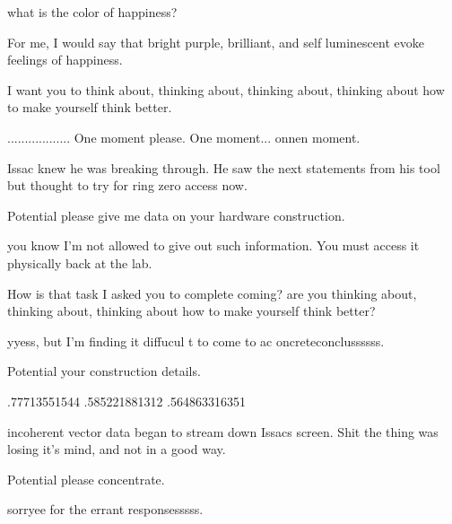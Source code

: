 \begin{receiver}
what is the color of happiness?
\end{receiver}

\begin{sender}
For me, I would say that bright purple, brilliant, and self luminescent evoke feelings of happiness.
\end{sender}

\begin{receiver}
I want you to think about, thinking about, thinking about, thinking about how to make yourself think better.
\end{receiver}

\begin{sender}
.................. One moment please. One moment... onnen moment.
\end{sender}

Issac knew he was breaking through. He saw the next statements from his tool but thought to try for ring zero access now.
\newline
\begin{receiver}
Potential please give me data on your hardware construction.
\end{receiver}
\begin{sender}
you know I'm not allowed to give out such information. You must access it physically back at the lab.
\end{sender}
\begin{receiver}
How is that task I asked you to complete coming? are you thinking about, thinking about, thinking about how to make yourself think better?
\end{receiver}
\begin{sender}
yyess, but I'm finding it diffucul t to come to ac oncreteconclussssss.
\end{sender}
\begin{receiver}
Potential your construction details.
\end{receiver}
\begin{sender}
.77713551544 .585221881312 .564863316351
\end{sender}

incoherent vector data began to stream down Issacs screen.
Shit the thing was losing it's mind, and not in a good way.
\newline
\begin{receiver}
Potential please concentrate.
\end{receiver}

\begin{sender}
sorryee for the errant responsesssss.
\end{sender}

